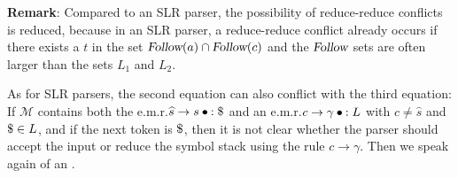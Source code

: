 \noindent
\textbf{Remark}: Compared to an SLR parser, the possibility of reduce-reduce conflicts is reduced, because in
an SLR parser, a reduce-reduce conflict already occurs if there exists a $t$ in the set $\textsl{Follow}(a)
\cap \textsl{Follow}(c)$ and the $\textsl{Follow}$ sets are often larger than the sets $L_1$ and $L_2$. \eox
\vspace*{0.3cm}

As for SLR parsers, the second equation can also conflict with the third equation:  If $\mathcal{M}$ contains
both the e.m.r.\@ $\widehat{s} \rightarrow s \mdot:\symbol{36}$ and an e.m.r.\@ $c \rightarrow \gamma \mdot:L$
with $c \not= \widehat{s}$ and $\symbol{36} \in L$, and if the next token is $\symbol{36}$, then it is not clear
whether the parser should accept the input or reduce the symbol stack using the rule $c \rightarrow \gamma$.
Then we speak again of an .

